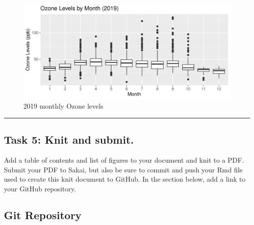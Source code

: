 \documentclass[
]{article}
\begin{document}
\begin{figure}

\includegraphics{LeahLi_A06_Crafting_Reports_files/figure-latex/ozone_2019-1} \hfill{}

\caption{2019 monthly Ozone levels}\label{fig:ozone_2019}
\end{figure}

\begin{center}\rule{0.5\linewidth}{0.5pt}\end{center}

\newpage

\subsection{Task 5: Knit and submit.}\label{task-5-knit-and-submit.}

Add a table of contents and list of figures to your document and knit to
a PDF. Submit your PDF to Sakai, but also be sure to commit and push
your Rmd file used to create this knit document to GitHub. In the
section below, add a link to your GitHub repository.

\subsection{Git Repository}\label{git-repository}
\end{document}
